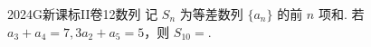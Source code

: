 
\begin{problem}{2024}{G}{新课标II卷}{12}{数列}
记 $S_n$ 为等差数列 $\{a_n\}$ 的前 $n$ 项和. 若 $a_3+a_4=7, 3a_2+a_5=5$，则 $S_{10}=$\underline{\hspace{4em}}.
\end{problem}